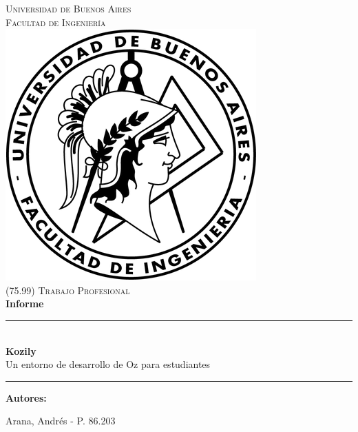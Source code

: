 \documentclass[a4paper,11pt]{article}
\begin{document}

\thispagestyle{empty}

\begin{titlepage}

  \newcommand{\HRule}{\rule{\linewidth}{0.5mm}}
  \newenvironment{bottompar}{\par\vspace*{\fill}}{\clearpage}

  \center

  \textsc{\LARGE Universidad de Buenos Aires}\\[0.5cm]
  \textsc{\Large Facultad de Ingeniería}\\[1.5cm]

  \includegraphics[scale=0.5]{assets/logo.png}\\[1cm]


  \textsc{\large (75.99) Trabajo Profesional}\\[0.25cm]
  {\huge \bfseries Informe} \\[0.4cm]
  \HRule \\[0.4cm]
  {\huge \bfseries Kozily} \\[0.4cm]
  Un entorno de desarrollo de Oz para estudiantes
  \HRule

  \begin{bottompar}
    \begin{minipage}[t]{.45\linewidth}
      \begin{flushleft}
        {\bfseries Autores:}

        Arana, Andrés          - P. 86.203


\end{flushleft}
\end{minipage}
\end{bottompar}
\end{titlepage}
\end{document}
